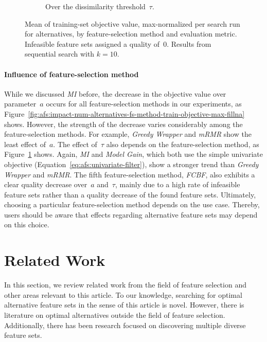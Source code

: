 \documentclass[iicol, sn-basic, Numbered]{sn-jnl} %
\theoremstyle{plain}
\theoremstyle{definition}
\begin{document}
\begin{figure}[t]
\begin{subfigure}[t]{0.49\textwidth}
		\caption{
			Over the dissimilarity threshold~$\tau$.
		}
		\label{fig:afs:impact-tau-fs-method-train-objective-max-fillna}
	\end{subfigure}
	\caption{
		Mean of training-set objective value, max-normalized per search run for alternatives, by feature-selection method and evaluation metric.
		Infeasible feature sets assigned a quality of~0.
		Results from sequential search with $k=10$.
	}
	\label{fig:afs:impact-parameters-fs-method}
\end{figure}

\paragraph{Influence of feature-selection method}

While we discussed \emph{MI} before, the decrease in the objective value over parameter~$a$ occurs for all feature-selection methods in our experiments, as Figure~\ref{fig:afs:impact-num-alternatives-fs-method-train-objective-max-fillna} shows.
However, the strength of the decrease varies considerably among the feature-selection methods.
For example, \emph{Greedy Wrapper} and \emph{mRMR} show the least effect of~$a$.
The effect of~$\tau$ also depends on the feature-selection method, as Figure~\ref{fig:afs:impact-tau-fs-method-train-objective-max-fillna} shows.
Again, \emph{MI} and \emph{Model Gain}, which both use the simple univariate objective (Equation~\ref{eq:afs:univariate-filter}), show a stronger trend than \emph{Greedy Wrapper} and \emph{mRMR}.
The fifth feature-selection method, \emph{FCBF}, also exhibits a clear quality decrease over~$a$ and~$\tau$, mainly due to a high rate of infeasible feature sets rather than a quality decrease of the found feature sets.
Ultimately, choosing a particular feature-selection method depends on the use case.
Thereby, users should be aware that effects regarding alternative feature sets may depend on this choice.

\section{Related Work}
\label{sec:afs:related-work}

In this section, we review related work from the field of feature selection and other areas relevant to this article.
To our knowledge, searching for optimal alternative feature sets in the sense of this article is novel.
However, there is literature on optimal alternatives outside the field of feature selection.
Additionally, there has been research focused on discovering multiple diverse feature sets.
\end{document}
